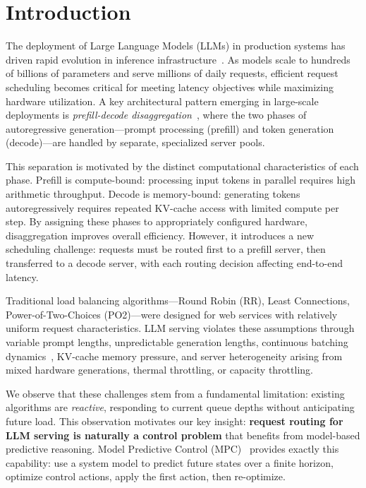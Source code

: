 \documentclass[runningheads]{llncs}
\begin{document}
\section{Introduction}

The deployment of Large Language Models (LLMs) in production systems has driven rapid evolution in inference infrastructure~\cite{kwon2023vllm,yu2022orca}. As models scale to hundreds of billions of parameters and serve millions of daily requests, efficient request scheduling becomes critical for meeting latency objectives while maximizing hardware utilization. A key architectural pattern emerging in large-scale deployments is \textit{prefill-decode disaggregation}~\cite{zhong2024distserve,patel2024splitwise}, where the two phases of autoregressive generation---prompt processing (prefill) and token generation (decode)---are handled by separate, specialized server pools.

This separation is motivated by the distinct computational characteristics of each phase. Prefill is compute-bound: processing input tokens in parallel requires high arithmetic throughput. Decode is memory-bound: generating tokens autoregressively requires repeated KV-cache access with limited compute per step. By assigning these phases to appropriately configured hardware, disaggregation improves overall efficiency. However, it introduces a new scheduling challenge: requests must be routed first to a prefill server, then transferred to a decode server, with each routing decision affecting end-to-end latency.

Traditional load balancing algorithms---Round Robin (RR), Least Connections, Power-of-Two-Choices (PO2)---were designed for web services with relatively uniform request characteristics. LLM serving violates these assumptions through variable prompt lengths, unpredictable generation lengths, continuous batching dynamics~\cite{yu2022orca}, KV-cache memory pressure, and server heterogeneity arising from mixed hardware generations, thermal throttling, or capacity throttling.

We observe that these challenges stem from a fundamental limitation: existing algorithms are \textit{reactive}, responding to current queue depths without anticipating future load. This observation motivates our key insight: \textbf{request routing for LLM serving is naturally a control problem} that benefits from model-based predictive reasoning. Model Predictive Control (MPC)~\cite{camacho2013mpc} provides exactly this capability: use a system model to predict future states over a finite horizon, optimize control actions, apply the first action, then re-optimize.
\end{document}
